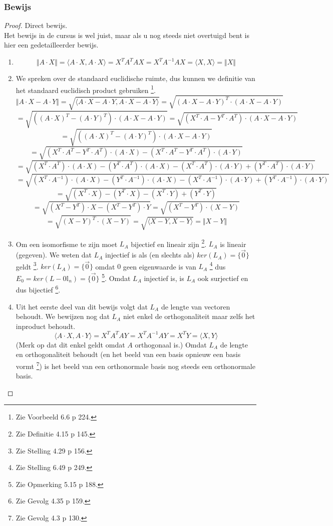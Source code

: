 \documentclass[lineaire_algebra_oplossingen.tex]{subfiles}
\begin{document}
\subsubsection*{Bewijs}
\begin{proof}
Direct bewijs.\\
Het bewijs in de cursus is wel juist, maar als u nog steeds niet overtuigd bent is hier een gedetailleerder bewijs.
\begin{enumerate}
\item
\[
\Vert A \cdot X \Vert = \langle A\cdot X, A\cdot X\rangle = X^TA^TAX =  X^TA^{-1}AX =\langle X,X\rangle = \Vert X\Vert
\]

\item
We spreken over de standaard euclidische ruimte, dus kunnen we definitie van het standaard euclidisch product gebruiken \footnote{Zie Voorbeeld 6.6 p 224.}.
\[
\Vert A\cdot X - A\cdot Y \Vert = \sqrt{\langle  A\cdot X - A\cdot Y ,  A\cdot X - A\cdot Y \rangle} = \sqrt{(A\cdot X - A\cdot Y)^T\cdot(A\cdot X - A\cdot Y)}
\]
\[
= \sqrt{((A\cdot X)^T - (A\cdot Y)^T)\cdot(A\cdot X - A\cdot Y)} = \sqrt{(X^T\cdot A - Y^T\cdot A^T)\cdot(A\cdot X - A\cdot Y)}
\]
\[
= \sqrt{((A\cdot X)^T - (A\cdot Y)^T)\cdot(A\cdot X - A\cdot Y)}
\]
\[ 
= \sqrt{(X^T\cdot A^T - Y^T\cdot A^T)\cdot(A\cdot X) - (X^T\cdot A^T - Y^T\cdot A^T)\cdot (A\cdot Y)}
\]
\[ 
= \sqrt{(X^T\cdot A^T)\cdot(A\cdot X) - (Y^T\cdot A^T)\cdot(A\cdot X) - (X^T\cdot A^T)\cdot (A\cdot Y) + (Y^T\cdot A^T)\cdot (A\cdot Y)}
\]
\[ 
= \sqrt{(X^T\cdot A^{-1})\cdot(A\cdot X) - (Y^T\cdot A^{-1})\cdot(A\cdot X) - (X^T\cdot A^{-1})\cdot (A\cdot Y) + (Y^T\cdot A^{-1})\cdot (A\cdot Y)}
\]
\[ 
= \sqrt{(X^T\cdot X) - (Y^T\cdot X) - (X^T\cdot Y) + (Y^T\cdot Y)}
\]
\[ 
= \sqrt{(X^T- Y^T)\cdot X - (X^T - Y^T) \cdot Y}
= \sqrt{(X^T- Y^T)\cdot (X - Y)}
\]
\[ 
= \sqrt{(X- Y)^T\cdot (X - Y)}
= \sqrt{\langle X-Y , X-Y \rangle}
= \Vert X-Y\Vert
\]

\item
Om een isomorfisme te zijn moet $L_A$ bijectief en lineair zijn \footnote{Zie Definitie 4.15 p 145.}. $L_A$ is lineair (gegeven). We weten dat $L_A$ injectief is als (en slechts als) $ker(L_A) = \{\vec{0}\}$ geldt \footnote{Zie Stelling 4.29 p 156.}. $ker(L_A) = \{\vec{0}\}$ omdat $0$ geen eigenwaarde is van $L_A$ \footnote{Zie Stelling 6.49 p 249.} dus $E_0 = ker(L - 0\mathbb{I}_n) = \{\vec{0}\}$ \footnote{Zie Opmerking 5.15 p 188.}. Omdat $L_A$ injectief is, is $L_A$ ook surjectief en dus bijectief \footnote{Zie Gevolg 4.35 p 159.}.

\item
Uit het eerste deel van dit bewijs volgt dat $L_A$ de lengte van vectoren behoudt. We bewijzen nog dat $L_A$ niet enkel de orthogonaliteit maar zelfs het inproduct behoudt.
\[
\langle A\cdot X, A\cdot Y \rangle = X^T A^T A Y = X^T A^{-1} A Y = X^T Y = \langle X, Y \rangle
\]
(Merk op dat dit enkel geldt omdat $A$ orthogonaal is.)
Omdat $L_A$ de lengte en orthogonaliteit behoudt (en het beeld van een basis opnieuw een basis vormt \footnote{Zie Gevolg 4.3 p 130.}) is het beeld van een orthonormale basis nog steeds een orthonormale basis.
\end{enumerate}
\end{proof}
\end{document}
